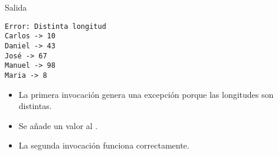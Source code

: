 

\begin{frame}[t,fragile]{Salida}
\begin{lstlisting}[style=terminal]
Error: Distinta longitud
Carlos -> 10
Daniel -> 43
José -> 67
Manuel -> 98
Maria -> 8
\end{lstlisting}
\begin{itemize}
  \item La primera invocación genera una excepción porque las longitudes son distintas.
  \item Se añade un valor al .
  \item La segunda invocación funciona correctamente.
\end{itemize}
\end{frame}

